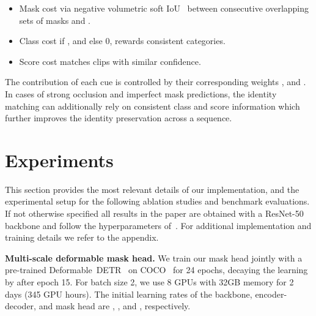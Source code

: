 \documentclass[runningheads]{llncs}
\newcommand{\detr}{\mbox{DETR}}
\begin{document}
\begin{itemize}
    \item Mask cost via negative volumetric soft IoU~\cite{IFC} between consecutive overlapping sets of masks  and .
    \item Class cost  if , and else 0, rewards consistent categories.
\item Score cost  matches clips with similar confidence.
\end{itemize}

The contribution of each cue is controlled by their corresponding weights ,  and . In cases of strong occlusion and imperfect mask predictions, the identity matching can additionally rely on consistent class and score information which further improves the identity preservation across a sequence.



































%
 \section{Experiments}
This section provides the most relevant details of our implementation, and the experimental setup for the following ablation studies and benchmark evaluations.
If not otherwise specified all results in the paper are obtained with a ResNet-50~\cite{resnet} backbone and follow the hyperparameters of~\cite{deformable_detr}.
For additional implementation and training details we refer to the appendix.



\noindent \textbf{Multi-scale deformable mask head.}
We train our mask head jointly with a pre-trained Deformable~\detr{}~\cite{deformable_detr} on COCO~\cite{COCO} for 24 epochs, decaying the learning by  after epoch 15.
For batch size 2, we use 8 GPUs with 32GB memory for 2 days (345 GPU hours).
The initial learning rates of the backbone, encoder-decoder, and mask head are , , and , respectively. 
\end{document}
